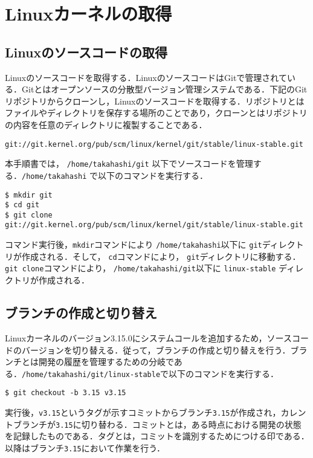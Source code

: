 \documentclass[12pt]{jsarticle}
\begin{document}
\section{Linuxカーネルの取得}
\label{sec:getkernel}
\subsection{Linuxのソースコードの取得}
Linuxのソースコードを取得する．LinuxのソースコードはGitで管理されている．Gitとはオープンソースの分散型バージョン管理システムである．下記のGitリポジトリからクローンし，Linuxのソースコードを取得する．リポジトリとはファイルやディレクトリを保存する場所のことであり，クローンとはリポジトリの内容を任意のディレクトリに複製することである．

\begin{verbatim}
git://git.kernel.org/pub/scm/linux/kernel/git/stable/linux-stable.git
\end{verbatim}
本手順書では， \verb|/home/takahashi/git| 以下でソースコードを管理する．\verb|/home/takahashi| で以下のコマンドを実行する．

\begin{verbatim}
$ mkdir git
$ cd git
$ git clone git://git.kernel.org/pub/scm/linux/kernel/git/stable/linux-stable.git
\end{verbatim}
コマンド実行後，\verb|mkdir|コマンドにより \verb|/home/takahashi|以下に \verb|git|ディレクトリが作成される．そして， \verb|cd|コマンドにより， \verb|git|ディレクトリに移動する．\verb|git clone|コマンドにより， \verb|/home/takahashi/git|以下に \verb|linux-stable| ディレクトリが作成される．

\subsection{ブランチの作成と切り替え}
Linuxカーネルのバージョン3.15.0にシステムコールを追加するため，ソースコードのバージョンを切り替える．従って，ブランチの作成と切り替えを行う．ブランチとは開発の履歴を管理するための分岐である．\verb|/home/takahashi/git/linux-stable|で以下のコマンドを実行する．

\begin{verbatim}
$ git checkout -b 3.15 v3.15
\end{verbatim}
実行後，\verb|v3.15|というタグが示すコミットからブランチ\verb|3.15|が作成され，カレントブランチが\verb|3.15|に切り替わる．コミットとは，ある時点における開発の状態を記録したものである．タグとは，コミットを識別するためにつける印である．以降はブランチ\verb|3.15|において作業を行う．
\end{document}
